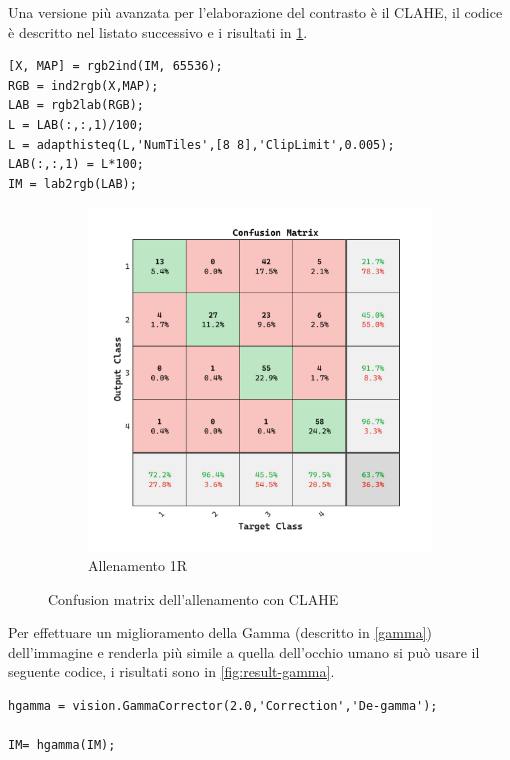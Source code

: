 Una versione più avanzata per l'elaborazione del contrasto è il CLAHE, il codice è descritto nel listato successivo e i risultati in \cref{fig:result-clahe}. 

\begin{lstlisting}
[X, MAP] = rgb2ind(IM, 65536);
RGB = ind2rgb(X,MAP);
LAB = rgb2lab(RGB);
L = LAB(:,:,1)/100;
L = adapthisteq(L,'NumTiles',[8 8],'ClipLimit',0.005);
LAB(:,:,1) = L*100;
IM = lab2rgb(LAB);
\end{lstlisting}

\begin{figure}[ht]
    \centering
    \begin{subfigure}{0.45\textwidth}
        \includegraphics[width=\textwidth]{addestramento-rete-neurale/one-clahe.pdf}
        \caption{Allenamento 1R} 
    \end{subfigure}
    \caption{Confusion matrix dell'allenamento con  CLAHE}
    \label{fig:result-clahe}
\end{figure}

Per effettuare un miglioramento della Gamma (descritto in \cref{gamma}) dell'immagine e renderla più simile a quella dell'occhio umano si può usare il seguente codice, i risultati sono in \cref{fig:result-gamma}.

\begin{lstlisting}
hgamma = vision.GammaCorrector(2.0,'Correction','De-gamma');

IM= hgamma(IM);
\end{lstlisting}

